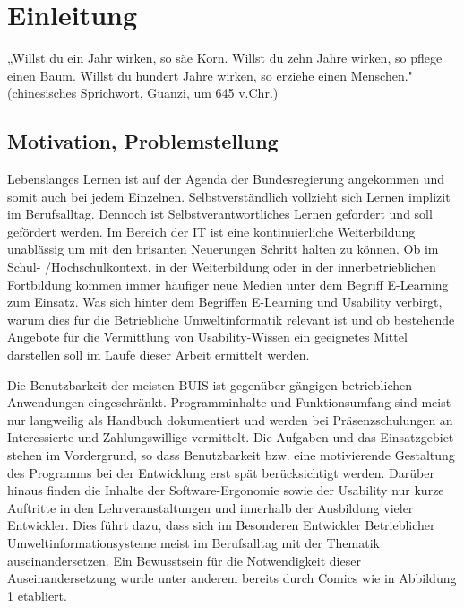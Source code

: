 \documentclass[a4paper, 12pt, twoside, BCOR=20mm, DIV=calc, abstracton, parskip=half*, toc=bibliography, toc=listof, headsepline, footsepline, headings=small, numbers=enddot]{scrreprt}
\begin{document}
	
	
	\tableofcontents
	
	
	\chapter{Einleitung} %
	„Willst du ein Jahr wirken, so säe Korn. Willst du zehn Jahre wirken, so pflege einen Baum. Willst du hundert Jahre wirken, so erziehe einen Menschen."
	(chinesisches Sprichwort, Guanzi, um 645 v.Chr.)
	
	\section{Motivation, Problemstellung}
	Lebenslanges Lernen ist auf der Agenda der Bundesregierung angekommen und somit auch bei jedem Einzelnen. Selbstverständlich vollzieht sich Lernen implizit im Berufsalltag. Dennoch ist Selbstverantwortliches Lernen gefordert und soll gefördert werden\cite{BLK}. Im Bereich der \ac{IT} ist eine kontinuierliche Weiterbildung unablässig um mit den brisanten Neuerungen Schritt halten zu können. Ob im Schul- /Hochschulkontext, in der Weiterbildung oder in der innerbetrieblichen Fortbildung kommen immer häufiger neue Medien unter dem Begriff E-Learning %
	zum Einsatz. Was sich hinter dem Begriffen E-Learning und Usability verbirgt, warum dies für die Betriebliche Umweltinformatik relevant ist und ob bestehende Angebote für die Vermittlung von Usability-Wissen ein geeignetes Mittel darstellen soll im Laufe dieser Arbeit ermittelt werden. 
	
	Die Benutzbarkeit der meisten \ac{BUIS} ist gegenüber gängigen betrieblichen Anwendungen eingeschränkt. Programminhalte und Funktionsumfang sind meist nur langweilig als Handbuch dokumentiert und werden bei Präsenzschulungen an Interessierte und Zahlungswillige vermittelt. Die Aufgaben und das Einsatzgebiet stehen im Vordergrund, so dass Benutzbarkeit bzw. eine motivierende Gestaltung des Programms bei der Entwicklung erst spät berücksichtigt werden.  
	Darüber hinaus finden die Inhalte der Software-Ergonomie sowie der Usability nur kurze Auftritte in den Lehrveranstaltungen und innerhalb der Ausbildung vieler Entwickler. Dies führt dazu, dass sich im Besonderen Entwickler Betrieblicher Umweltinformationsysteme meist im Berufsalltag mit der Thematik auseinandersetzen. Ein Bewusstsein für die Notwendigkeit dieser Auseinandersetzung wurde unter anderem bereits durch Comics wie in Abbildung 1 etabliert.
	
\end{document}
